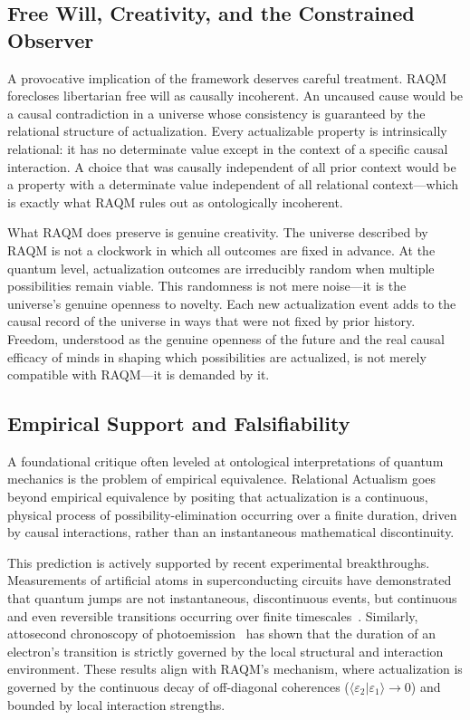 \documentclass[11pt,a4paper]{article}
\theoremstyle{plain}
\theoremstyle{definition}
\theoremstyle{remark}
\newcommand{\braket}[2]{\langle #1 | #2 \rangle}
\begin{document}
\subsection{Free Will, Creativity, and the Constrained Observer}

A provocative implication of the framework deserves careful treatment. RAQM
forecloses libertarian free will as causally incoherent. An uncaused cause would
be a causal contradiction in a universe whose consistency is guaranteed by the
relational structure of actualization. Every actualizable property is intrinsically
relational: it has no determinate value except in the context of a specific causal
interaction. A choice that was causally independent of all prior context would be a
property with a determinate value independent of all relational context---which is
exactly what RAQM rules out as ontologically incoherent.

What RAQM does preserve is genuine creativity. The universe described by RAQM is
not a clockwork in which all outcomes are fixed in advance. At the quantum level,
actualization outcomes are irreducibly random when multiple possibilities remain
viable. This randomness is not mere noise---it is the universe's genuine openness
to novelty. Each new actualization event adds to the causal record of the universe
in ways that were not fixed by prior history. Freedom, understood as the genuine
openness of the future and the real causal efficacy of minds in shaping which
possibilities are actualized, is not merely compatible with RAQM---it is demanded
by it.

\subsection{Empirical Support and Falsifiability}
\label{sec:falsify}

A foundational critique often leveled at ontological interpretations of quantum
mechanics is the problem of empirical equivalence. Relational Actualism goes beyond
empirical equivalence by positing that actualization is a continuous, physical
process of possibility-elimination occurring over a finite duration, driven by
causal interactions, rather than an instantaneous mathematical discontinuity.

This prediction is actively supported by recent experimental breakthroughs.
Measurements of artificial atoms in superconducting circuits have demonstrated
that quantum jumps are not instantaneous, discontinuous events, but continuous and
even reversible transitions occurring over finite timescales~\citep{Minev2019}.
Similarly, attosecond chronoscopy of photoemission~\citep{Pazourek2015} has shown
that the duration of an electron's transition is strictly governed by the local
structural and interaction environment. These results align with RAQM's mechanism,
where actualization is governed by the continuous decay of off-diagonal coherences
($\braket{\varepsilon_2}{\varepsilon_1} \to 0$) and bounded by local interaction
strengths.
\end{document}
